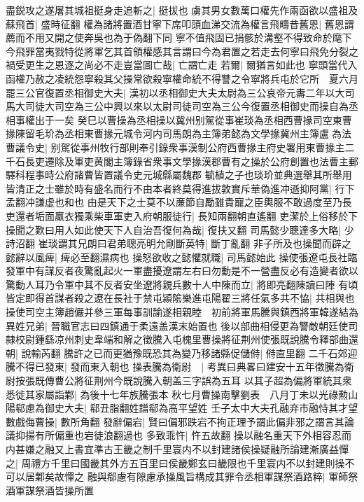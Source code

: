 盡鋭攻之遂屠其城祖挺身走追斬之|{
	挺拔也}
虜其男女數萬口權先作兩函欲以盛祖及蘇飛首|{
	盛時征翻}
權為諸將置酒甘寧下席叩頭血涕交流為權言飛疇昔舊恩|{
	舊恩謂薦而不用又開之使奔吳也為于偽翻下同}
寧不值飛固已捐骸於溝壑不得致命於麾下今飛罪當夷戮特從將軍乞其首領權感其言謂曰今為君置之若走去何寧曰飛免分裂之禍受更生之恩逐之尚必不走豈當圖亡哉|{
	亡謂亡走}
若爾|{
	爾猶言如此也}
寧頭當代入函權乃赦之凌統怨寧殺其父操常欲殺寧權命統不得讐之令寧將兵屯於它所　夏六月罷三公官復置丞相御史大夫|{
	漢初以丞相御史大夫太尉為三公哀帝元夀二年以大司馬大司徒大司空為三公中興以來以太尉司徒司空為三公今復置丞相御史而操自為丞相事權出于一矣}
癸巳以曹操為丞相操以冀州别駕從事崔琰為丞相西曹掾司空東曹掾陳留毛玠為丞相東曹掾元城令河内司馬朗為主簿弟懿為文學掾冀州主簿盧為法曹議令史|{
	别駕從事州牧行部則奉引錄衆事漢制公府西曹掾主府史署用東曹掾主二千石長吏遷除及軍吏黄閣主簿錄省衆事文學掾漢郡曹有之操於公府創置也法曹主郵驛科程事時公府諸曹皆置議令史元城縣屬魏郡}
毓植之子也琰玠並典選舉其所舉用皆清正之士雖於時有盛名而行不由本者終莫得進拔敦實斥華偽進冲遜抑阿黨|{
	行下孟翻冲謙虚也和也}
由是天下之士莫不以亷節自勵雖貴寵之臣輿服不敢過度至乃長吏還者垢面羸衣獨乘柴車軍吏入府朝服徒行|{
	長知兩翻朝直遙翻}
吏潔於上俗移於下操聞之歎曰用人如此使天下人自治吾復何為哉|{
	復扶又翻}
司馬懿少聰達多大略|{
	少詩沼翻}
崔琰謂其兄朗曰君弟聰亮明允剛斷英特|{
	斷丁亂翻}
非子所及也操聞而辟之懿辭以風痺|{
	痺必至翻濕病也}
操怒欲收之懿懼就職|{
	司馬懿始此}
操使張遼屯長社臨發軍中有謀反者夜驚亂起火一軍盡擾遼謂左右曰勿動是不一營盡反必有造變者欲以驚動人耳乃令軍中其不反者安坐遼將親兵數十人中陳而立|{
	將即亮翻陳讀曰陣}
有頃皆定即得首謀者殺之遼在長社于禁屯潁隂樂進屯陽翟三將任氣多共不恊|{
	共相與也}
操使司空主簿趙儼并參三軍每事訓諭遂相親睦　初前將軍馬騰與鎮西將軍韓遂結為異姓兄弟|{
	晉職官志曰四鎮通于柔遠盖漢末始置也}
後以部曲相侵更為讐敵朝廷使司隸校尉鍾繇凉州刺史韋端和解之徵騰入屯槐里曹操將征荆州使張既說騰令釋部曲還朝|{
	說輸芮翻}
騰許之已而更猶豫既恐其為變乃移諸縣促儲偫|{
	偫直里翻}
二千石郊迎騰不得已發東|{
	發而東入朝也}
操表騰為衛尉　|{
	考異曰典畧曰建安十五年徵騰為衛尉按張既傳曹公將征荆州今既說騰入朝盖三字誤為五耳}
以其子超為偏將軍統其衆悉徙其家屬詣鄴|{
	為後十七年族騰張本}
秋七月曹操南擊劉表　八月丁未以光祿勲山陽郗慮為御史大夫|{
	郗丑脂翻姓譜郗為高平望姓}
壬子太中大夫孔融弃市融恃其才望數戲侮曹操|{
	數所角翻}
發辭偏宕|{
	賢曰偏邪跌宕不拘正理予謂此偏非邪之謂言其論議抑揚有所偏重也宕徒浪翻過也}
多致乖忤|{
	忤五故翻}
操以融名重天下外相容忍而内甚嫌之融又上書宜準古王畿之制千里寰内不以封建諸侯操疑融所論建漸廣益憚之|{
	周禮方千里曰國畿其外方五百里曰侯畿鄭玄曰畿限也千里寰内不以封建則操不可以居鄴矣故憚之}
融與郗慮有隙慮承操風旨構成其罪令丞相軍謀祭酒路粹|{
	軍師祭酒軍謀祭酒皆操所置}
